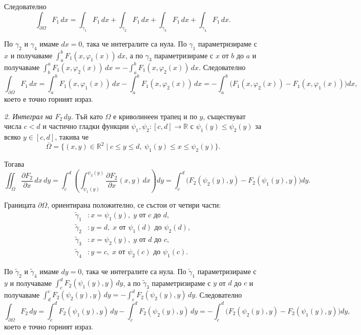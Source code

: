 \documentclass[10pt]{article}
\begin{document}
Следователно
\[
\int_{\partial\Omega} F_1\,dx = \int_{\gamma_1} F_1\,dx + \int_{\gamma_2} F_1\,dx + \int_{\gamma_3} F_1\,dx + \int_{\gamma_4} F_1\,dx.
\]

По $\gamma_2$ и $\gamma_4$ имаме $dx = 0$, така че интегралите са нула. 
По $\gamma_1$ параметризираме с $x$ и получаваме $\int_a^b F_1(x,\varphi_1(x))\,dx$, 
а по $\gamma_3$ параметризираме с $x$ от $b$ до $a$ и получаваме $\int_b^a F_1(x,\varphi_2(x))\,dx = -\int_a^b F_1(x,\varphi_2(x))\,dx$. 
Следователно
\[
\int_{\partial\Omega} F_1\,dx = \int_a^b F_1(x,\varphi_1(x))\,dx - \int_a^b F_1(x,\varphi_2(x))\,dx = -\int_a^b \bigl( F_1(x,\varphi_2(x)) - F_1(x,\varphi_1(x)) \bigr) dx,
\]
което е точно горният израз.

\textit{2. Интеграл на $F_2\,dy$.} 
Тъй като $\Omega$ е криволинеен трапец и по $y$, съществуват числа $c < d$ и частично гладки функции $\psi_1, \psi_2 : [c,d] \to \mathbb{R}$ с $\psi_1(y) \le \psi_2(y)$ за всяко $y \in [c,d]$, такива че
\[
\overline{\Omega} = \{ (x,y) \in \mathbb{R}^2 \mid c \le y \le d,\ \psi_1(y) \le x \le \psi_2(y) \}.
\]

Тогава
\[
\iint_{\Omega} \frac{\partial F_2}{\partial x} \, dx\,dy = \int_c^d \left( \int_{\psi_1(y)}^{\psi_2(y)} \frac{\partial F_2}{\partial x}(x,y)\,dx \right) dy = \int_c^d \bigl( F_2(\psi_2(y),y) - F_2(\psi_1(y),y) \bigr) dy.
\]

Границата $\partial\Omega$, ориентирана положително, се състои от четири части:
\begin{align*}
\tilde\gamma_1 &: x = \psi_1(y),\; y \text{ от } c \text{ до } d, \\
\tilde\gamma_2 &: y = d,\; x \text{ от } \psi_1(d) \text{ до } \psi_2(d), \\
\tilde\gamma_3 &: x = \psi_2(y),\; y \text{ от } d \text{ до } c, \\
\tilde\gamma_4 &: y = c,\; x \text{ от } \psi_2(c) \text{ до } \psi_1(c).
\end{align*}

По $\tilde\gamma_2$ и $\tilde\gamma_4$ имаме $dy = 0$, така че интегралите са нула. 
По $\tilde\gamma_1$ параметризираме с $y$ и получаваме $\int_c^d F_2(\psi_1(y),y)\,dy$, 
а по $\tilde\gamma_3$ параметризираме с $y$ от $d$ до $c$ и получаваме $\int_d^c F_2(\psi_2(y),y)\,dy = -\int_c^d F_2(\psi_2(y),y)\,dy$. 
Следователно
\[
\int_{\partial\Omega} F_2\,dy = \int_c^d F_2(\psi_1(y),y)\,dy - \int_c^d F_2(\psi_2(y),y)\,dy = -\int_c^d \bigl( F_2(\psi_2(y),y) - F_2(\psi_1(y),y) \bigr) dy,
\]
което е точно горният израз.
\end{document}
